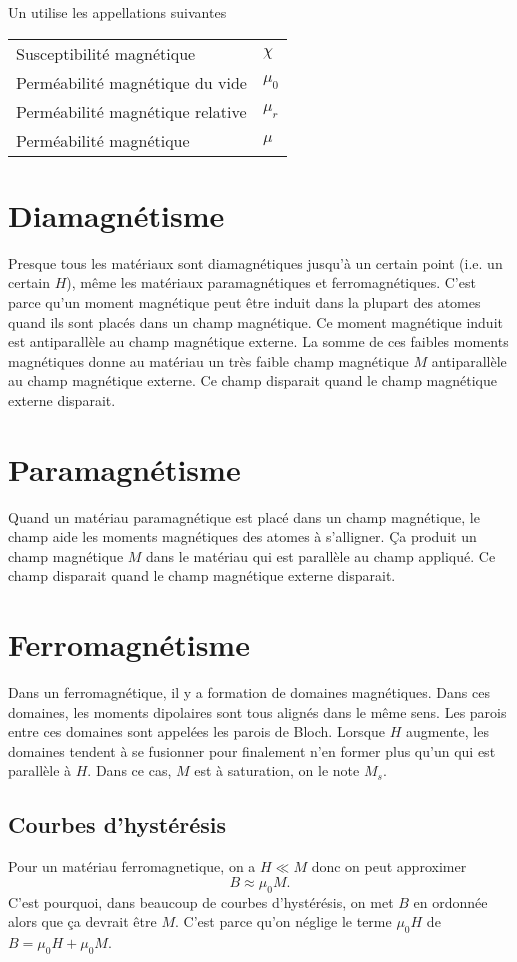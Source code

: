 Un utilise les appellations suivantes
\begin{center}
  \begin{tabular}{ll}
    Susceptibilité magnétique & $\chi$\\
    Perméabilité magnétique du vide & $\mu_0$\\
    Perméabilité magnétique relative & $\mu_r$\\
    Perméabilité magnétique & $\mu$
  \end{tabular}
\end{center}

\section{Diamagnétisme}
Presque tous les matériaux sont diamagnétiques jusqu'à un certain point
(i.e. un certain $H$), même les matériaux paramagnétiques et ferromagnétiques.
C'est parce qu'un moment magnétique peut être induit dans la plupart
des atomes quand ils sont placés dans un champ magnétique.
Ce moment magnétique induit est antiparallèle au champ magnétique externe.
La somme de ces faibles moments magnétiques donne au matériau
un très faible champ magnétique $M$ antiparallèle au champ magnétique externe.
Ce champ disparait quand le champ magnétique externe disparait.

\section{Paramagnétisme}
Quand un matériau paramagnétique est placé dans un champ magnétique,
le champ aide les moments magnétiques des atomes à s'alligner.
Ça produit un champ magnétique $M$ dans le matériau
qui est parallèle au champ appliqué.
Ce champ disparait quand le champ magnétique externe disparait.

\section{Ferromagnétisme}
\label{sec:ferro}
Dans un ferromagnétique, il y a formation de domaines magnétiques.
Dans ces domaines, les moments dipolaires sont tous alignés dans le même sens.
Les parois entre ces domaines sont appelées les parois de Bloch.
Lorsque $H$ augmente,
les domaines tendent à se fusionner pour finalement
n'en former plus qu'un qui est parallèle à $H$.
Dans ce cas, $M$ est à saturation, on le note $M_s$.

\subsection{Courbes d'hystérésis}
Pour un matériau ferromagnetique, on a $H \ll M$ donc on peut approximer
\[ B \approx \mu_0 M. \]
C'est pourquoi, dans beaucoup de courbes d'hystérésis,
on met $B$ en ordonnée alors que ça devrait être $M$.
C'est parce qu'on néglige le terme $\mu_0 H$ de $B = \mu_0 H + \mu_0 M$.

